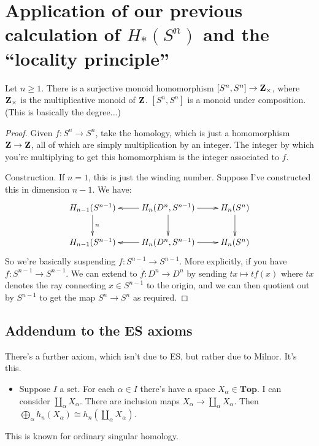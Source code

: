\section{Application of our previous calculation of $ H_\ast(S^n)$ and the ``locality principle''}
\begin{theorem}
Let $n\geq 1$. There is a surjective monoid homomorphism $[S^n,S^n]\to \mathbf Z_\times$, where $\mathbf Z_\times$ is the multiplicative monoid of $\mathbf Z$. $[S^n,S^n]$ is a monoid under composition. (This is basically the degree...)
\end{theorem}
\begin{proof}
Given $f:S^n\to S^n$, take the homology, which is just a homomorphism $\mathbf Z\to \mathbf Z$, all of which are simply multiplication by an integer. The integer by which you're multiplying to get this homomorphism is the integer associated to $f$.

Construction. If $n=1$, this is just the winding number. Suppose I've constructed this in dimension $n-1$. We have:
	\begin{equation*}
	\xymatrix{ H_{n-1}(S^{n-1})\ar[d]^n & \ar[l] H_n(D^n,S^{n-1})\ar[r]\ar[d] & H_n(S^n)\ar[d]\\
	 H_{n-1}(S^{n-1}) & \ar[l] H_n(D^n,S^{n-1})\ar[r] & H_n(S^n)}
	\end{equation*}
So we're basically suspending $f:S^{n-1}\to S^{n-1}$. More explicitly, if you have $f:S^{n-1}\to S^{n-1}$. We can extend to $\overline{f}:D^n\to D^n$ by sending $tx\mapsto tf(x)$ where $tx$ denotes the ray connecting $x\in S^{n-1}$ to the origin, and we can then quotient out by $S^{n-1}$ to get the map $S^n\to S^n$ as required.
\end{proof}
\subsection{Addendum to the ES axioms}
There's a further axiom, which isn't due to ES, but rather due to Milnor. It's this.
\begin{itemize}
\item Suppose $I$ a set. For each $\alpha\in I$ there's have a space $X_\alpha\in\mathbf{Top}$. I can consider $\coprod_\alpha X_\alpha$. There are inclusion maps $X_\alpha\to\coprod_\alpha X_\alpha$. Then $\bigoplus_\alpha h_n(X_\alpha)\cong h_n\left(\coprod_\alpha X_\alpha\right)$.
\end{itemize}
This is known for ordinary singular homology.
